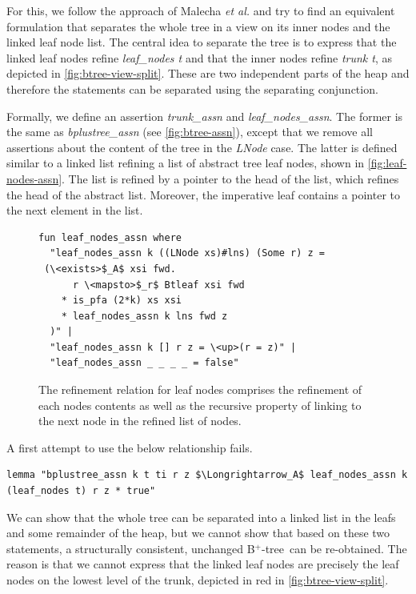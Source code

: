 \documentclass[a4paper,UKenglish,cleveref, autoref, thm-restate]{lipics-v2021}
\newcommand{\btree}{B$^+$-tree}
\begin{document}
For this, we follow the approach of Malecha \emph{et al.} \cite{DBLP:conf/popl/MalechaMSW10} and
try to find an equivalent formulation that separates the whole tree in a
view on its inner nodes and the linked leaf node list.
The central idea to separate the tree is to
express that the linked leaf nodes refine \emph{leaf\_nodes t}
and that the inner nodes refine \emph{trunk t}, as depicted in \autoref{fig:btree-view-split}.
These are two independent parts of the heap and therefore
the statements can be separated using the separating conjunction.

Formally, we define an assertion \emph{trunk\_assn} and \emph{leaf\_nodes\_assn}.
The former is the same as \emph{bplustree\_assn} (see \autoref{fig:btree-assn}),
except that we remove all assertions about the content of the tree in the \emph{LNode} case.
The latter is defined similar to a linked list refining a list of abstract tree leaf nodes,
shown in \autoref{fig:leaf-nodes-assn}.
The list is refined by a pointer to the head of the list,
which refines the head of the abstract list.
Moreover, the imperative leaf contains a pointer to the next element in the list.

\begin{figure}
    \centering
\begin{lstlisting}[mathescape=true, language=Isabelle,label=lst:leaf-nodes-assn]
fun leaf_nodes_assn where
  "leaf_nodes_assn k ((LNode xs)#lns) (Some r) z =
 (\<exists>$_A$ xsi fwd.
      r \<mapsto>$_r$ Btleaf xsi fwd
    * is_pfa (2*k) xs xsi
    * leaf_nodes_assn k lns fwd z
  )" |
  "leaf_nodes_assn k [] r z = \<up>(r = z)" |
  "leaf_nodes_assn _ _ _ _ = false"
\end{lstlisting}
\caption[Definition of \emph{leaf\_nodes\_assn}]{
    The refinement relation for leaf nodes comprises the refinement
    of each nodes contents as well as the recursive property of linking to the next node
    in the refined list of nodes.
}
\label{fig:leaf-nodes-assn}
\end{figure}


A first attempt to use the below relationship fails.

\begin{lstlisting}[mathescape=true, language=Isabelle,label=lst:btree-view-split-oneway]
lemma "bplustree_assn k t ti r z $\Longrightarrow_A$ leaf_nodes_assn k (leaf_nodes t) r z * true"
\end{lstlisting}

We can show that the whole tree can be separated into a linked list in the leafs
and some remainder of the heap, but we cannot show that based on
these two statements, a structurally consistent, unchanged \btree\ can be re-obtained.
The reason is that we cannot express that the linked leaf nodes
are precisely the leaf nodes on the lowest level of the trunk, depicted
in red in \autoref{fig:btree-view-split}.
\end{document}
